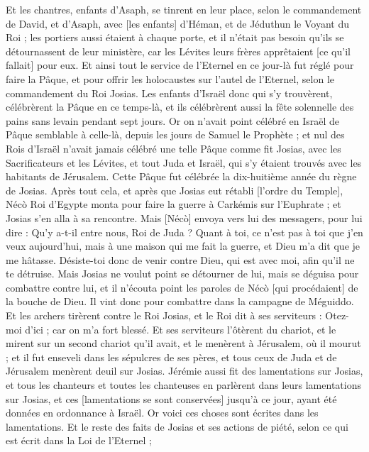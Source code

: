 \begin{multicols}{2}
Et les chantres, enfants d'Asaph, se tinrent en leur place, selon le commandement de David, et d'Asaph, avec [les enfants] d'Héman, et de Jéduthun le Voyant du Roi ; les portiers aussi étaient à chaque porte, et il n'était pas besoin qu'ils se détournassent de leur ministère, car les Lévites leurs frères apprêtaient [ce qu'il fallait] pour eux.
Et ainsi tout le service de l'Eternel en ce jour-là fut réglé pour faire la Pâque, et pour offrir les holocaustes sur l'autel de l'Eternel, selon le commandement du Roi Josias.
Les enfants d'Israël donc qui s'y trouvèrent, célébrèrent la Pâque en ce temps-là, et ils célébrèrent aussi la fête solennelle des pains sans levain pendant sept jours.
Or on n'avait point célébré en Israël de Pâque semblable à celle-là, depuis les jours de Samuel le Prophète ; et nul des Rois d'Israël n'avait jamais célébré une telle Pâque comme fit Josias, avec les Sacrificateurs et les Lévites, et tout Juda et Israël, qui s'y étaient trouvés avec les habitants de Jérusalem.
Cette Pâque fut célébrée la dix-huitième année du règne de Josias.
Après tout cela, et après que Josias eut rétabli [l'ordre du Temple], Nécò Roi d'Egypte monta pour faire la guerre à Carkémis sur l'Euphrate ; et Josias s'en alla à sa rencontre.
Mais [Nécò] envoya vers lui des messagers, pour lui dire : Qu'y a-t-il entre nous, Roi de Juda ? Quant à toi, ce n'est pas à toi que j'en veux aujourd'hui, mais à une maison qui me fait la guerre, et Dieu m'a dit que je me hâtasse. Désiste-toi donc de venir contre Dieu, qui est avec moi, afin qu'il ne te détruise.
Mais Josias ne voulut point se détourner de lui, mais se déguisa pour combattre contre lui, et il n'écouta point les paroles de Nécò [qui procédaient] de la bouche de Dieu. Il vint donc pour combattre dans la campagne de Méguiddo.
Et les archers tirèrent contre le Roi Josias, et le Roi dit à ses serviteurs : Otez-moi d'ici ; car on m'a fort blessé.
Et ses serviteurs l'ôtèrent du chariot, et le mirent sur un second chariot qu'il avait, et le menèrent à Jérusalem, où il mourut ; et il fut enseveli dans les sépulcres de ses pères, et tous ceux de Juda et de Jérusalem menèrent deuil sur Josias.
Jérémie aussi fit des lamentations sur Josias, et tous les chanteurs et toutes les chanteuses en parlèrent dans leurs lamentations sur Josias, et ces [lamentations se sont conservées] jusqu'à ce jour, ayant été données en ordonnance à Israël. Or voici ces choses sont écrites dans les lamentations.
Et le reste des faits de Josias et ses actions de piété, selon ce qui est écrit dans la Loi de l'Eternel ;

\end{multicols}
